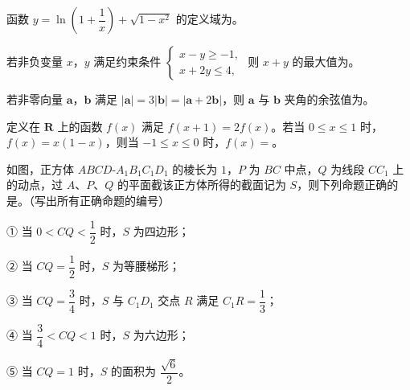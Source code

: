 \begin{question}
函数 $y=\ln\left(1+\dfrac1x\right)+\sqrt{1-x^2}$ 的定义域为\gkblank{}。

\end{question}
\begin{question}
若非负变量 $x$，$y$ 满足约束条件 $\begin{cases}x-y\geqslant-1,\\ x+2y\leqslant4,\end{cases}$ 则 $x+y$ 的最大值为\gkblank{}。

\end{question}
\begin{question}
若非零向量 $\boldsymbol a$，$\boldsymbol b$ 满足 $|\boldsymbol a|=3|\boldsymbol b|=|\boldsymbol a+2\boldsymbol b|$，则 $\boldsymbol a$ 与 $\boldsymbol b$ 夹角的余弦值为\gkblank{}。

\end{question}
\begin{question}
定义在 $\mathbf R$ 上的函数 $f(x)$ 满足 $f(x+1)=2f(x)$。若当 $0\leqslant x\leqslant1$ 时，$f(x)=x(1-x)$，则当 $-1\leqslant x\leqslant0$ 时，$f(x)=$\gkblank{}。

\Needspace{0.4\textheight}
\end{question}
\begin{question}
如图，正方体 $ABCD\text{-}A_1B_1C_1D_1$ 的棱长为 $1$，$P$ 为 $BC$ 中点，$Q$ 为线段 $CC_1$ 上的动点，过 $A$、$P$、$Q$ 的平面截该正方体所得的截面记为 $S$，则下列命题正确的是\gkblank{}。（写出所有正确命题的编号）
\nopagebreak[4]
\begin{center}\end{center}
\nopagebreak[4]
\noindent ① 当 $0<CQ<\dfrac12$ 时，$S$ 为四边形；

\noindent ② 当 $CQ=\dfrac12$ 时，$S$ 为等腰梯形；

\noindent ③ 当 $CQ=\dfrac34$ 时，$S$ 与 $C_1D_1$ 交点 $R$ 满足 $C_1R=\dfrac13$；

\noindent ④ 当 $\dfrac34<CQ<1$ 时，$S$ 为六边形；

\noindent ⑤ 当 $CQ=1$ 时，$S$ 的面积为 $\dfrac{\sqrt6}2$。

\end{question}


